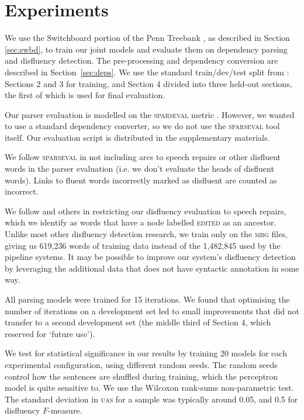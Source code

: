 \documentclass[11pt,letterpaper]{article}
\newcommand{\sparseval}{\textsc{sparseval}\xspace}
\begin{document}
\section{Experiments}

We use the Switchboard portion of the Penn Treebank \citep{marcus:93}, as
described in Section \ref{sec:swbd}, to train our joint
models and evaluate them on dependency parsing and disfluency detection. The
pre-processing and dependency conversion are described in Section~\ref{sec:deps}.
We use the standard train/dev/test split from \citet{Charniak01a}: Sections 2
and 3 for training, and Section 4 divided into three held-out sections, the first
of which is used for final evaluation.

Our parser evaluation is modelled on the \sparseval metric \citep{sparseval}.
However, we wanted to use a standard dependency converter, so we
do not use the \sparseval tool itself.  Our evaluation script is distributed
in the supplementary materials.

We follow \sparseval in not including arcs to speech repairs or other disfluent
words in the parser evaluation (i.e. we don't evaluate the heads of disfluent
words).  Links to fluent words incorrectly marked as disfluent are counted as
incorrect.  

We follow \citet{Johnson04a} and others in restricting our disfluency evaluation
to speech repairs, which we identify as words that have a node labelled \textsc{edited}
as an ancestor.  Unlike most other disfluency detection research, we train only
on the \textsc{mrg} files, giving us 619,236 words of training data instead of
the 1,482,845 used by the pipeline systems.  It may be possible to improve our
system's disfluency detection by leveraging the additional data that does not
have syntactic annotation in some way.

All parsing models were trained for 15 iterations.
We found that optimising the number of iterations on a development set led to
small improvements that did not transfer to a second development set (the middle
third of Section 4, which \citet{Charniak01a} reserved for `future use').

We test for statistical significance in our results by training 20 models for
each experimental configuration, using different random seeds. The random seeds
control how the sentences are shuffled during training, which the perceptron
model is quite sensitive to.  We use the Wilcoxon rank-sums non-parametric test.
The standard deviation in \textsc{uas} for a sample was typically around 0.05,
and 0.5 for disfluency $F$-measure.
\end{document}
